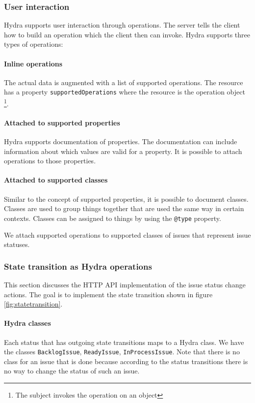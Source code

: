 \subsubsection{User interaction}
Hydra supports user interaction through operations. The server tells the client how to build an operation which the client then can invoke. Hydra supports three types of operations:

\paragraph{Inline operations}
The actual data is augmented with a list of supported operations. The resource has a property \lstinline{supportedOperations} where the resource is the operation object \footnote{The subject invokes the operation on an object}.

\paragraph{Attached to supported properties}
Hydra supports documentation of properties. The documentation can include information about which values are valid for a property. It is possible to attach operations to those properties.

\paragraph{Attached to supported classes}
Similar to the concept of supported properties, it is possible to document classes. Classes are used to group things together that are used the same way in certain contexts. Classes can be assigned to things by using the \lstinline{@type} property.

We attach supported operations to supported classes of issues that represent issue statuses.

\subsubsection{State transition as Hydra operations}
This section discusses the HTTP API implementation of the issue status change actions. The goal is to implement the state transition shown in figure \ref{fig:statetransition}.

\paragraph{Hydra classes}\label{par:classes}
Each status that has outgoing state transitions maps to a Hydra class. We have the classes \lstinline{BacklogIssue}, \lstinline{ReadyIssue}, \lstinline{InProcessIssue}. Note that there is no class for an issue that is done because according to the status transitions there is no way to change the status of such an issue.

